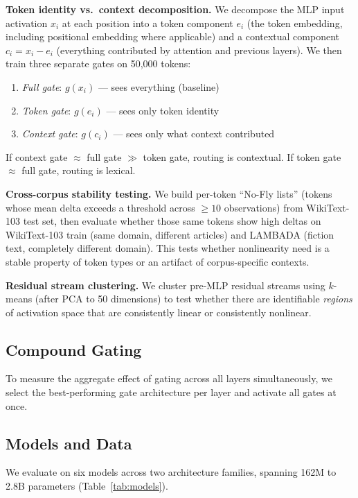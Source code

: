 \documentclass[11pt]{article}
\begin{document}
\textbf{Token identity vs.\ context decomposition.} We decompose the MLP input activation $x_i$ at each position into a token component $e_i$ (the token embedding, including positional embedding where applicable) and a contextual component $c_i = x_i - e_i$ (everything contributed by attention and previous layers). We then train three separate gates on 50,000 tokens:
\begin{enumerate}
    \item \textit{Full gate}: $g(x_i)$ --- sees everything (baseline)
    \item \textit{Token gate}: $g(e_i)$ --- sees only token identity
    \item \textit{Context gate}: $g(c_i)$ --- sees only what context contributed
\end{enumerate}
If context gate $\approx$ full gate $\gg$ token gate, routing is contextual. If token gate $\approx$ full gate, routing is lexical.

\textbf{Cross-corpus stability testing.} We build per-token ``No-Fly lists'' (tokens whose mean delta exceeds a threshold across $\geq 10$ observations) from WikiText-103 test set, then evaluate whether those same tokens show high deltas on WikiText-103 train (same domain, different articles) and LAMBADA \citep{paperno2016} (fiction text, completely different domain). This tests whether nonlinearity need is a stable property of token types or an artifact of corpus-specific contexts.

\textbf{Residual stream clustering.} We cluster pre-MLP residual streams using $k$-means (after PCA to 50 dimensions) to test whether there are identifiable \textit{regions} of activation space that are consistently linear or consistently nonlinear.

\subsection{Compound Gating}

To measure the aggregate effect of gating across all layers simultaneously, we select the best-performing gate architecture per layer and activate all gates at once.

\subsection{Models and Data}

We evaluate on six models across two architecture families, spanning 162M to 2.8B parameters (Table~\ref{tab:models}).
\end{document}
